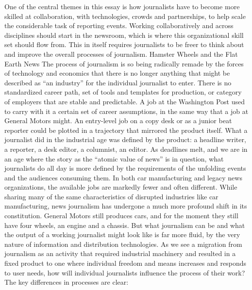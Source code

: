 One of the central themes in this essay is how journalists have to become more
skilled at collaboration, with technologies, crowds and partnerships, to help scale
the considerable task of reporting events. Working collaboratively and across disciplines
should start in the newsroom, which is where this organizational skill set
should flow from. This in itself requires journalists to be freer to think about and
improve the overall processes of journalism.
Hamster Wheels and the Flat Earth News
The process of journalism is so being radically remade by the forces of technology
and economics that there is no longer anything that might be described as
``an industry'' for the individual journalist to enter.
There is no standardized career path, set of tools and templates for production,
or category of employers that are stable and predictable. A job at the Washington
Post used to carry with it a certain set of career assumptions, in the same way that
a job at General Motors might. An entry-level job on a copy desk or as a junior
beat reporter could be plotted in a trajectory that mirrored the product itself.
What a journalist did in the industrial age was defined by the product: a headline
writer, a reporter, a desk editor, a columnist, an editor. As deadlines melt, and we
are in an age where the story as the ``atomic value of news'' is in question, what
journalists do all day is more defined by the requirements of the unfolding events
and the audiences consuming them.
In both car manufacturing and legacy news organizations, the available jobs are
markedly fewer and often different. While sharing many of the same characteristics
of disrupted industries like car manufacturing, news journalism has undergone a
much more profound shift in its constitution. General Motors still produces cars,
and for the moment they still have four wheels, an engine and a chassis. But what
journalism can be and what the output of a working journalist might look like is
far more fluid, by the very nature of information and distribution technologies.
As we see a migration from journalism as an activity that required industrial
machinery and resulted in a fixed product to one where individual freedom and
means increases and responds to user needs, how will individual journalists influence
the process of their work? The key differences in processes are clear:

